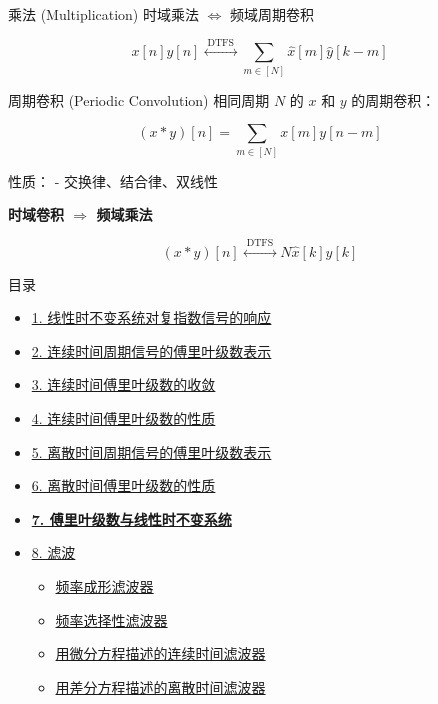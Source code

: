 \documentclass[
  ignorenonframetext,
]{beamer}
\providecommand{\tightlist}{%
  \setlength{\itemsep}{0pt}\setlength{\parskip}{0pt}}
\begin{document}
\begin{frame}{乘法 (Multiplication)}
\protect{}\label{ux4e58ux6cd5-multiplication-1}
时域乘法 \(\Longleftrightarrow\) 频域周期卷积

\[
x[n] y[n] \stackrel{\text { DTFS }}{\longleftrightarrow} \sum_{m \in[N]} \hat{x}[m] \hat{y}[k-m]
\]
\end{frame}

\begin{frame}{周期卷积 (Periodic Convolution)}
\protect{}\label{ux5468ux671fux5377ux79ef-periodic-convolution-1}
相同周期 \(N\) 的 \(x\) 和 \(y\) 的周期卷积：

\[
(x * y)[n]=\sum_{m \in[N]} x[m] y[n-m]
\]

性质： - 交换律、结合律、双线性

\textbf{时域卷积 \(\Longrightarrow\) 频域乘法}

\[
(x * y)[n] \stackrel{\text { DTFS }}{\longleftrightarrow} N \hat{x}[k] \hat{y}[k]
\]
\end{frame}

\begin{frame}{目录}
\protect{}\label{toc6}
\begin{itemize}
\tightlist
\item
  \hyperlink{sec31}{1. 线性时不变系统对复指数信号的响应}
\item
  \hyperlink{sec32}{2. 连续时间周期信号的傅里叶级数表示}
\item
  \hyperlink{sec33}{3. 连续时间傅里叶级数的收敛}
\item
  \hyperlink{sec34}{4. 连续时间傅里叶级数的性质}
\item
  \hyperlink{35}{5. 离散时间周期信号的傅里叶级数表示}
\item
  \hyperlink{sec36}{6. 离散时间傅里叶级数的性质}
\item
  \hyperlink{sec37}{\textbf{7. 傅里叶级数与线性时不变系统}}
\item
  \hyperlink{sec38}{8. 滤波}

  \begin{itemize}
  \tightlist
  \item
    \hyperlink{sec381}{频率成形滤波器}
  \item
    \hyperlink{sec382}{频率选择性滤波器}
  \item
    \hyperlink{sec383}{用微分方程描述的连续时间滤波器}
  \item
    \hyperlink{sec383}{用差分方程描述的离散时间滤波器}
  \end{itemize}
\end{itemize}
\end{frame}
\end{document}
